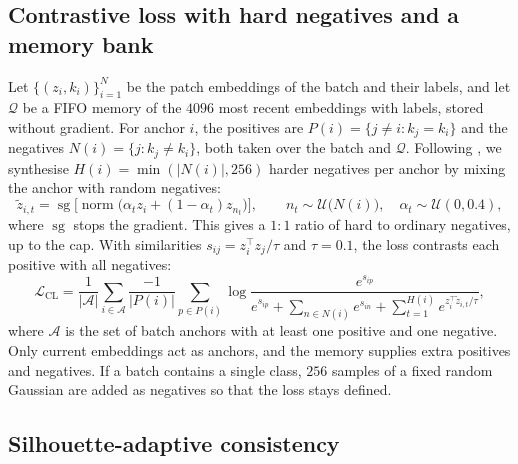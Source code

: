 \documentclass[11pt]{article}
\newcommand{\Lcl}{\mathcal{L}_{\mathrm{CL}}}
\newcommand{\sg}{\operatorname{sg}}
\newcommand{\nrm}{\operatorname{norm}}
\begin{document}
\subsection{Contrastive loss with hard negatives and a memory bank}
\label{sec:cl}

Let $\{(z_i,k_i)\}_{i=1}^{N}$ be the patch embeddings of the batch and their labels, and let $\mathcal{Q}$ be a FIFO memory of the $4096$ most recent embeddings with labels, stored without gradient. For anchor $i$, the positives are $P(i)=\{j\neq i: k_j=k_i\}$ and the negatives $N(i)=\{j: k_j\neq k_i\}$, both taken over the batch and $\mathcal{Q}$. Following \citet{kalantidis2020mochi}, we synthesise $H(i)=\min(|N(i)|,256)$ harder negatives per anchor by mixing the anchor with random negatives:
\begin{equation}
  \tilde z_{i,t}=\sg\bigl[\nrm\bigl(\alpha_t z_i+(1-\alpha_t)z_{n_t}\bigr)\bigr],\qquad n_t\sim\mathcal{U}\bigl(N(i)\bigr),\quad \alpha_t\sim\mathcal{U}(0,0.4),
  \label{eq:hard}
\end{equation}
where $\sg$ stops the gradient. This gives a $1{:}1$ ratio of hard to ordinary negatives, up to the cap. With similarities $s_{ij}=z_i^\top z_j/\tau$ and $\tau=0.1$, the loss contrasts each positive with all negatives:
\begin{equation}
  \Lcl=\frac{1}{|\mathcal{A}|}\sum_{i\in\mathcal{A}}\frac{-1}{|P(i)|}\sum_{p\in P(i)}\log\frac{e^{s_{ip}}}{e^{s_{ip}}+\sum_{n\in N(i)}e^{s_{in}}+\sum_{t=1}^{H(i)}e^{z_i^\top\tilde z_{i,t}/\tau}},
  \label{eq:cl}
\end{equation}
where $\mathcal{A}$ is the set of batch anchors with at least one positive and one negative. Only current embeddings act as anchors, and the memory supplies extra positives and negatives. If a batch contains a single class, $256$ samples of a fixed random Gaussian are added as negatives so that the loss stays defined.

\subsection{Silhouette-adaptive consistency}
\label{sec:cr}
\end{document}
